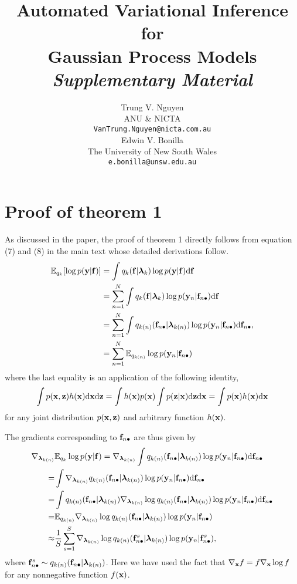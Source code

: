 \documentclass{article} %
\title{Automated Variational Inference for \\ Gaussian Process Models \\ \textsl{Supplementary Material}}
\author{
Trung V. Nguyen \\
ANU \& NICTA\\
\texttt{VanTrung.Nguyen@nicta.com.au} \\
\And
Edwin V. Bonilla \\
The University of New South Wales \\
\texttt{e.bonilla@unsw.edu.au} \\
}
\begin{document}
\maketitle

\section{Proof of theorem 1}
As discussed in the paper, the proof of theorem 1 directly follows from equation (7) and (8) in the main text whose detailed derivations follow.
\newcommand{\lamk}{\llambda_{k}}
\newcommand{\lamkn}{\llambda_{k(n)}}
\newcommand{\lamki}{\llambda_{k(i)}}
\newcommand{\efi}{\f_{(i)}}
\newcommand{\gradkn}{\nabla_{\lamkn} \log q_{k(n)} (\fn | \lamkn)}
\begin{align}
\expectation_{q_k} [\log p(\y | \f )]
&= \int q_k(\f | \lamk) \log p(\y | \f) \der \f \\
&= \sum_{n=1}^N \int q_k(\f | \lamk)  \log p(\y_n | \fn) \der \f \\
&= \sum_{n=1}^N \int q_{k(n)}(\fn | \lamkn)  \log p(\y_n | \fn) \der \fn, \\
&= \sum_{n=1}^N \expectation_{q_{k(n)}} \log p(\y_n | \fn)
\label{eq:expectedllh}
\end{align}
where the last equality is an application of the following identity,
\begin{align}
\int p(\mathbf{x}, \mathbf{z}) h(\mathbf{x}) \mathrm{d} \mathbf{x} \mathrm{d} \mathbf{z} = \int h(\mathbf{x}) p(\mathbf{x}) \int p(\mathbf{z} | \mathbf{x}) \mathrm{d} \mathbf{z} \mathrm{d} \mathbf{x} = \int p(\mathbf{x}) h(\mathbf{x}) \mathrm{d} \mathbf{x}
\end{align}
for any joint distribution $p(\mathbf{x}, \mathbf{z})$ and arbitrary function $h(\mathbf{x})$.

The gradients corresponding to $\mathbf{f}_{n \bullet}$ are thus given by
\begin{align}
\nabla_{\lamkn} & \expectation_{q_k} \log p(\y | \f )
= \nabla_{\lamkn} \int q_{k(n)}(\fn | \lamkn)  \log p(\y_n | \fn) \der \fn \\
=&  \int \nabla_{\lamkn} q_{k(n)}(\fn | \lamkn)  \log p(\y_n | \fn) \der \fn \\
=& \int q_{k(n)}(\fn | \lamkn) \gradkn \log p(\y_n | \fn) \der \fn  \\
\label{eq:gradient}
=& \expectation_{q_{k(n)}} \gradkn \log p(\y_n | \fn) \\
\approx& \frac{1}{S} \sum_{s=1}^S \nabla_{\lamkn} \log q_{k(n)} (\fn^s | \lamkn) \log p(\y_n | \fn^s),
\end{align}
where $\fn^s \sim q_{k(n)} (\fn | \lamkn)$.
Here we have used the fact that $\nabla_{\mathbf{x}} f = f \nabla_{\mathbf{x}} \log f$ for any nonnegative function $f(\mathbf{x})$.
\end{document}
